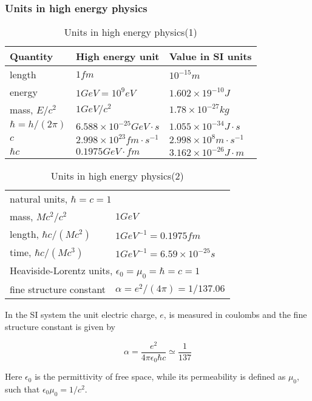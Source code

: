 \documentclass[en, device=normal]{elegantnote}
\begin{document}
\subsubsection{Units in high energy physics}

\begin{table}[h]
  \centering
  \caption{Units in high energy physics(1)}
    \begin{tabular}{lll}
    \toprule
    Quantity & High energy unit & Value in SI units \\
    \midrule
    length & $1fm$ & $10^{-15}m$ \\
    energy & $1GeV=10^9eV$ & $1.602\times 19^{-10}J$ \\
    mass, $E/c^2$ & $1GeV/c^2$ & $1.78\times 10^{-27}kg$ \\
    $\hbar=h/(2\pi)$ & $6.588\times 10^{-25}GeV\cdot s$ & $1.055\times 10^{-34}J\cdot s$ \\
    $c$ & $2.998\times 10^{23}fm\cdot s^{-1}$ & $2.998\times 10^8m\cdot s^{-1}$ \\
    $\hbar c$ & $0.1975GeV\cdot fm$ & $3.162\times 10^{-26}J\cdot m$ \\
    \bottomrule
    \end{tabular}
\end{table}

\begin{table}[h]
  \centering
  \caption{Units in high energy physics(2)}
  \begin{tabular}{ll}
    \hline
    \multicolumn{2}{l}{natural units, $\hbar=c=1$} \\
    mass, $Mc^2/c^2$ & $1GeV$ \\
    length, $\hbar c/(Mc^2)$ & $1GeV^{-1}=0.1975fm$ \\
    time, $\hbar c/(Mc^3)$ & $1GeV^{-1}=6.59\times 10^{-25}s$ \\
    \hline
    \multicolumn{2}{l}{Heaviside-Lorentz units, $\epsilon_0=\mu_0=\hbar=c=1$} \\
    fine structure constant & $\alpha=e^2/(4\pi)=1/137.06$ \\
    \hline
  \end{tabular}
\end{table}

In the SI system the unit electric charge, $e$, is measured in coulombs and the fine structure 
constant is given by

$$\alpha=\frac{e^2}{4\pi\epsilon_0\hbar c}\simeq\frac{1}{137}$$

Here $\epsilon_0$ is the permittivity of free space, while its permeability is defined as $\mu_0$, 
such that $\epsilon_0\mu_0=1/c^2$.
\end{document}
